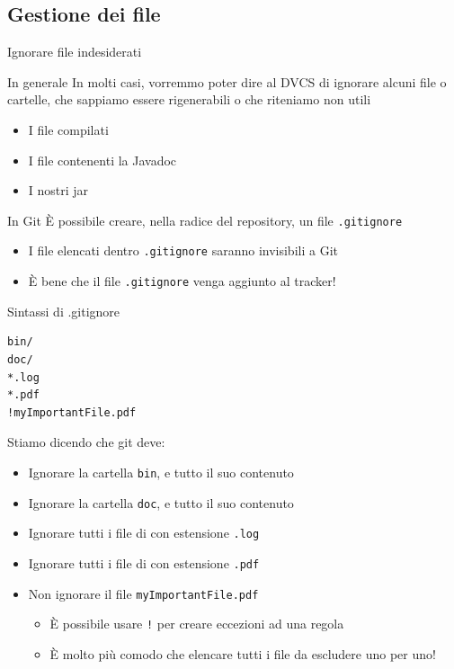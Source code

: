 \documentclass[presentation]{beamer}
\begin{document}
\subsection{Gestione dei file}

\begin{frame}{Ignorare file indesiderati}
	\begin{block}{In generale}
		In molti casi, vorremmo poter dire al DVCS di ignorare alcuni file o cartelle, che sappiamo essere rigenerabili o che riteniamo non utili
		\begin{itemize}
			\item I file compilati
			\item I file contenenti la Javadoc
			\item I nostri jar
		\end{itemize}
	\end{block}
	\begin{block}{In Git}
		È possibile creare, nella radice del repository, un file \texttt{.gitignore}
		\begin{itemize}
			\item I file elencati dentro \texttt{.gitignore} saranno invisibili a Git
			\item È bene che il file \texttt{.gitignore} venga aggiunto al tracker!
		\end{itemize}
	\end{block}
	\begin{block}{Sintassi di .gitignore}
		\begin{Verbatim}[fontsize=\scriptsize]
bin/
doc/
*.log
*.pdf
!myImportantFile.pdf
		\end{Verbatim}
		Stiamo dicendo che git deve:
		\begin{itemize}
			\item Ignorare la cartella \texttt{bin}, e tutto il suo contenuto
			\item Ignorare la cartella \texttt{doc}, e tutto il suo contenuto
			\item Ignorare tutti i file di con estensione \texttt{.log}
			\item Ignorare tutti i file di con estensione \texttt{.pdf}
			\item Non ignorare il file \texttt{myImportantFile.pdf}
			\begin{itemize}
				\item È possibile usare \texttt{!} per creare eccezioni ad una regola
				\item È molto più comodo che elencare tutti i file da escludere uno per uno!

\end{itemize}
\end{itemize}
\end{block}
\end{frame}
\end{document}
